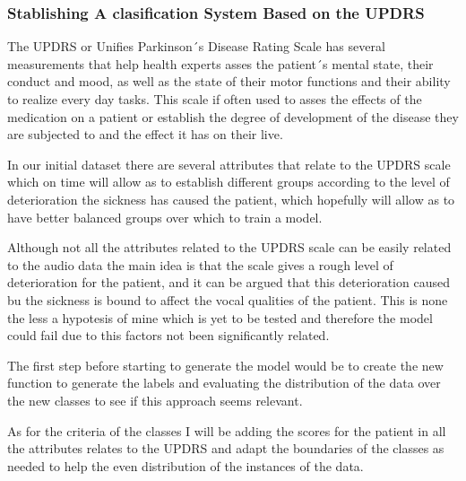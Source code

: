 \documentclass[12pt, a4paper]{article}
\begin{document}
	\clearpage
	
	\subsubsection{Stablishing A clasification System Based on the UPDRS}
	
	The UPDRS or Unifies Parkinson´s Disease Rating Scale has several measurements that help health experts asses the patient´s mental state, their conduct and mood, as well as the state of their motor functions and their ability to realize every day tasks. This scale if often used to asses the effects of the medication on a patient or establish the degree of development of the disease they are subjected to and the effect it has on their live.
	
	In our initial dataset there are several attributes that relate to the UPDRS scale which on time will allow as to establish different groups according to the level of deterioration the sickness has caused the patient, which hopefully will allow as to have better balanced groups over which to train a model.
	
	\vspace{5mm}
	
	
	
	\clearpage
	
	Although not all the attributes related to the UPDRS scale can be easily related to the audio data the main idea is that the scale gives a rough level of deterioration for the patient, and it can be argued that this deterioration caused bu the sickness is bound to affect the vocal qualities of the patient. This is none the less a hypotesis of mine which is yet to be tested and therefore the model could fail due to this factors not been significantly related.
	
	The first step before starting to generate the model would be to create the new function to generate the labels and evaluating the distribution of the data over the new classes to see if this approach seems relevant.
	
	As for the criteria of the classes I will be adding the scores for the patient in all the attributes relates to the UPDRS and adapt the boundaries of the classes as needed to help the even distribution of the instances of the data.
	
	\vspace{10mm}
	
\end{document}
